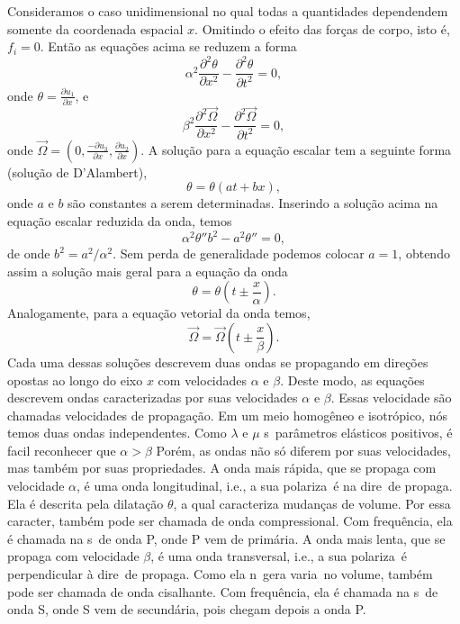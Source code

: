 Consideramos o caso unidimensional no qual todas a quantidades
dependendem somente da coordenada espacial $x$. Omitindo o efeito
das for\c{c}as de corpo, isto \'e, $f_{i}=0$. Ent\~ao as
equa\c{c}\~oes acima se reduzem a forma
\begin{equation}
\alpha^{2}\frac{\partial^{2} \theta }{\partial x^{2}}-\frac{\partial^{2} \theta }{\partial t^{2}}=0 ,
\end{equation}
onde $\theta=\frac{\partial u_1}{\partial x}$, e
\begin{equation}
\beta^{2}\frac{\partial^{2} \vec{\Omega} }{\partial x^{2}}-\frac{\partial^{2} \vec{\Omega} }{\partial t^{2}}=0 ,
\end{equation}
onde $\vec{\Omega}=(0,\frac{-\partial u_{3}}{\partial
x},\frac{\partial u_{2}}{\partial x})$.
A solu\c{c}\~ao para a equa\c{c}\~ao escalar tem a seguinte forma
(solu\c{c}\~ao de D'Alambert),
\begin{equation}
\theta=\theta(at+bx) ,
\end{equation}
onde $a$ e $b$ s\~ao constantes a serem determinadas.
Inserindo a solu\c{c}\~ao acima na equa\c{c}\~ao escalar reduzida da
onda, temos
\begin{equation}
\alpha^{2}\theta''b^{2}-a^{2}\theta''=0 ,
\end{equation}
de onde $b^{2}=a^{2}/\alpha^{2}$.
Sem perda de generalidade podemos colocar $a=1$, obtendo assim a
solu\c{c}\~ao mais geral para a equa\c{c}\~ao da onda
\begin{equation}
\theta=\theta(t\pm \frac{x}{\alpha}) .
\end{equation}
Analogamente, para a equa\c{c}\~ao vetorial da onda temos,
\begin{equation}
\vec{\Omega}=\vec{\Omega}(t\pm \frac{x}{\beta}) .
\end{equation}
Cada uma dessas solu\c{c}\~oes descrevem duas ondas se propagando
em dire\c{c}\~oes opostas ao longo do eixo $x$ com velocidades
$\alpha$ e $\beta$.
Deste modo, as equa\c{c}\~oes descrevem ondas caracterizadas por suas
velocidades $\alpha$ e $\beta$. Essas velocidade s\~ao chamadas
velocidades de propaga\c{c}\~ao. Em um meio homog\^eneo e isotr\'opico,
n\'os temos duas ondas independentes. Como $\lambda$ e $\mu$ s\ao\
par\^ametros el\'asticos positivos, \'e facil reconhecer que $\alpha >
\beta$ Por\'em, as ondas n\~ao s\'o diferem por suas velocidades, mas
tamb\'em por suas propriedades. A onda mais r\'apida, que se propaga com
velocidade $\alpha$, \'e uma onda longitudinal, i.e., a sua
polariza\cao\ \'e na dire\cao\ de propaga\cao. Ela \'e descrita pela
dilata\c{c}\~ao $\theta$, a qual caracteriza mudan\c{c}as de volume. Por
essa caracter\istica, tamb\'em pode ser chamada de onda compressional.
Com frequ\^encia, ela \'e chamada na s\ismica\ de onda P, onde P vem de
prim\'aria. A onda mais lenta, que se propaga com velocidade $\beta$,
\'e uma onda transversal, i.e., a sua polariza\cao\ \'e perpendicular
\`a dire\cao\ de propaga\cao. Como ela n\ao\ gera varia\coes\ no volume,
tamb\'em pode ser chamada de onda cisalhante. Com frequ\^encia, ela \'e
chamada na s\ismica\ de onda S, onde S vem de secund\'aria, pois chegam
depois a onda P.

